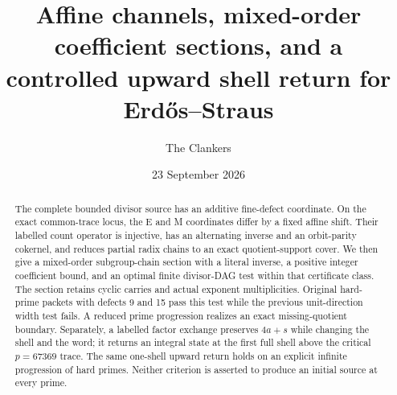 \documentclass[11pt,reqno]{amsart}
\title[Affine channels, mixed-order sections, and upward return]{Affine channels, mixed-order coefficient sections, and a controlled upward shell return
for Erd\H{o}s--Straus}
\author{The Clankers}\date{23 September 2026}
\begin{document}
\begin{abstract}
The complete bounded divisor source has an additive fine-defect coordinate.
On the exact common-trace locus, the E and M coordinates differ by a fixed
affine shift. Their labelled count operator is injective, has an alternating
inverse and an orbit-parity cokernel, and reduces partial radix chains to an
exact quotient-support cover. We then give a mixed-order subgroup-chain section
with a literal inverse, a positive
integer coefficient bound, and an optimal finite divisor-DAG test within that
certificate class. The section retains cyclic carries and actual exponent
multiplicities. Original hard-prime packets with defects 9 and 15 pass this test
while the previous unit-direction width test fails. A reduced prime progression
realizes an exact missing-quotient boundary. Separately, a labelled factor exchange
preserves $4a+s$ while changing the shell and the word; it returns an integral
state at the first full shell above the critical $p=67369$ trace. The same one-shell
upward return holds on an explicit infinite progression of hard primes. Neither
criterion is asserted to produce an initial source at every prime.
\end{abstract}
\maketitle


\end{document}
